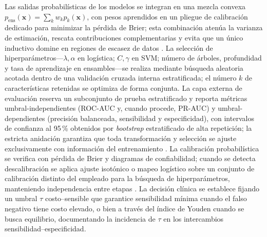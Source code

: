 Las salidas probabilísticas de los modelos se integran en una mezcla convexa \(p_{\mathrm{ens}}(\mathbf{x})=\sum_{k}w_{k}p_{k}(\mathbf{x})\), con pesos aprendidos en un pliegue de calibración dedicado para minimizar la pérdida de Brier; esta combinación atenúa la varianza de estimación, rescata contribuciones complementarias y evita que un único inductivo domine en regiones de escasez de datos \cite{Pedregosa2011}. La selección de hiperparámetros—\(\lambda,\alpha\) en logística; \(C,\gamma\) en SVM; número de árboles, profundidad y tasa de aprendizaje en ensambles—se realiza mediante búsqueda aleatoria acotada dentro de una validación cruzada interna estratificada; el número \(k\) de características retenidas se optimiza de forma conjunta. La capa externa de evaluación reserva un subconjunto de prueba estratificado y reporta métricas umbral-independientes (ROC-AUC y, cuando procede, PR-AUC) y umbral-dependientes (precisión balanceada, sensibilidad y especificidad), con intervalos de confianza al 95\,\% obtenidos por \emph{bootstrap} estratificado de alta repetición; la estricta anidación garantiza que toda transformación y selección se ajuste exclusivamente con información del entrenamiento \cite{Vabalas2019,Tsamardinos2022}. La calibración probabilística se verifica con pérdida de Brier y diagramas de confiabilidad; cuando se detecta descalibración se aplica ajuste isotónico o mapeo logístico sobre un conjunto de calibración distinto del empleado para la búsqueda de hiperparámetros, manteniendo independencia entre etapas \cite{Pedregosa2011}. La decisión clínica se establece fijando un umbral \(\tau\) costo–sensible que garantice sensibilidad mínima cuando el falso negativo tiene costo elevado, o bien a través del índice de Youden cuando se busca equilibrio, documentando la incidencia de \(\tau\) en los intercambios sensibilidad–especificidad.

